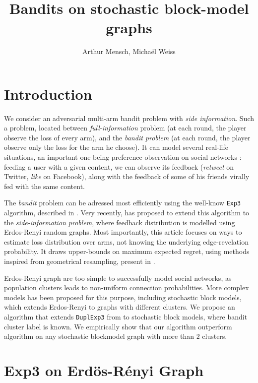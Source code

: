 \documentclass[11pt,a4paper]{article}
\title{Bandits on stochastic block-model graphs}
\author{Arthur Mensch, Michaël Weiss}
\begin{document}
\maketitle

\section{Introduction}
\paragraph{}We consider an adversarial multi-arm bandit problem with \textit{side information}. Such a problem, located between \textit{full-information} problem (at each round, the player observe the loss of every arm), and the \textit{bandit problem} (at each round, the player observe only the loss for the arm he choose). It can model several real-life situations, an important one being preference observation on social networks : feeding a user with a given content, we can observe its feedback (\textit{retweet} on Twitter, \textit{like} on Facebook), along with the feedback of some of his friends virally fed with the same content.

The \textit{bandit} problem can be adressed most efficiently using the well-know \verb|Exp3| algorithm, described in \cite{exp3}. Very recently, \cite{valko} has proposed to extend this algorithm to the \textit{side-information problem}, where feedback distribution is modelled using Erdos-Renyi random graphs. Most importantly, this article focuses on ways to estimate loss distribution over arms, not knowing the underlying edge-revelation probability. It draws upper-bounds on maximum expected regret, using methods inspired from geometrical resampling, present in \cite{neu}.

Erdos-Renyi graph are too simple to successfully model social networks, as population clusters leads to non-uniform connection probabilities. More complex models has been proposed for this purpose, including stochastic block models, which extends Erdos-Renyi to graphs with different clusters. We propose an algorithm that extends \verb|DuplExp3| from \cite{valko} to stochastic block models, where bandit cluster label is known. We empirically show that our algorithm outperform \cite{valko} algorithm on any stochastic blockmodel graph with more than $2$ clusters. 

\section{Exp3 on Erdös-Rényi Graph}
\end{document}
